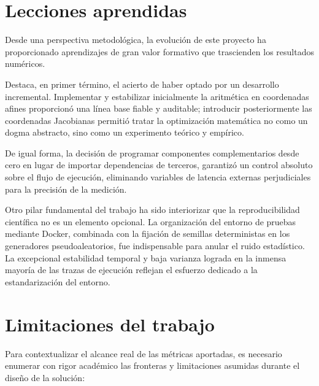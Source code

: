 \section{Lecciones aprendidas}
\label{sec:conc-lecciones}

Desde una perspectiva metodológica, la evolución de este proyecto ha proporcionado aprendizajes de gran valor formativo que trascienden los resultados numéricos. 

Destaca, en primer término, el acierto de haber optado por un desarrollo incremental. Implementar y estabilizar inicialmente la aritmética en coordenadas afines proporcionó una línea base 
fiable y auditable; introducir posteriormente las coordenadas Jacobianas permitió tratar la optimización matemática no como un dogma abstracto, sino como un experimento teórico y empírico. 

De igual forma, la decisión de programar componentes complementarios desde cero en lugar de importar dependencias de terceros, garantizó un control absoluto sobre el flujo de ejecución, eliminando variables de latencia externas perjudiciales para la precisión de la medición.

Otro pilar fundamental del trabajo ha sido interiorizar que la reproducibilidad científica no es un elemento opcional. La organización del entorno de pruebas mediante Docker, combinada con la 
fijación de semillas deterministas en los generadores pseudoaleatorios, fue indispensable para anular el ruido estadístico. La excepcional estabilidad temporal y baja varianza lograda en la 
inmensa mayoría de las trazas de ejecución reflejan el esfuerzo dedicado a la estandarización del entorno.

\section{Limitaciones del trabajo}
\label{sec:conc-limitaciones}

Para contextualizar el alcance real de las métricas aportadas, es necesario enumerar con rigor académico las fronteras y limitaciones asumidas durante el diseño de la solución:

